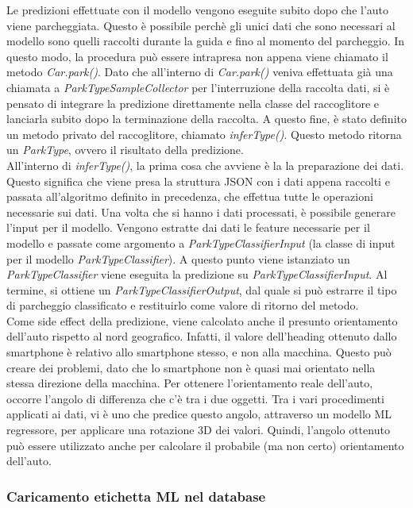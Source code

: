 Le predizioni effettuate con il modello vengono eseguite subito dopo che l'auto viene 
parcheggiata. Questo è possibile perchè gli unici dati che sono necessari al modello
sono quelli raccolti durante la guida e fino al momento del parcheggio. In questo modo,
la procedura può essere intrapresa non appena viene chiamato il metodo \emph{Car.park()}.
Dato che all'interno di \emph{Car.park()} veniva effettuata già una chiamata a 
\emph{ParkTypeSampleCollector} per l'interruzione della raccolta dati, si è pensato di 
integrare la predizione direttamente nella classe del raccoglitore e lanciarla subito
dopo la terminazione della raccolta. A questo fine, è stato definito un metodo privato
del raccoglitore, chiamato \emph{inferType()}. Questo metodo ritorna un \emph{ParkType},
ovvero il risultato della predizione.\\
All'interno di \emph{inferType()}, la prima cosa che avviene è la la preparazione dei 
dati. Questo significa che viene presa la struttura JSON con i dati appena raccolti e 
passata all'algoritmo definito in precedenza, che effettua tutte le operazioni necessarie
sui dati. Una volta che si hanno i dati processati, è possibile generare l'input per il 
modello. %
Vengono estratte dai dati le feature necessarie per il modello e passate come
argomento a \emph{ParkTypeClassifierInput} (la classe di input per il modello 
\emph{ParkTypeClassifier}). A questo punto viene istanziato un \emph{ParkTypeClassifier} 
viene eseguita la predizione su \emph{ParkTypeClassifierInput}. Al termine, si ottiene
un \emph{ParkTypeClassifierOutput}, dal quale si può estrarre il tipo di parcheggio 
classificato e restituirlo come valore di ritorno del metodo.\\
Come side effect della predizione, viene calcolato anche il presunto orientamento
dell'auto rispetto al nord geografico. Infatti, il valore dell'heading ottenuto 
dallo smartphone è relativo allo smartphone stesso, e non alla macchina. Questo 
può creare dei problemi, dato che lo smartphone non è quasi mai orientato nella 
stessa direzione della macchina. Per ottenere l'orientamento reale dell'auto,
occorre l'angolo di differenza che c'è tra i due oggetti. Tra i vari procedimenti 
applicati ai dati, vi è uno che predice questo angolo, attraverso un modello 
ML regressore, per applicare una rotazione 3D dei valori. Quindi, l'angolo ottenuto
può essere utilizzato anche per calcolare il probabile (ma non certo) orientamento
dell'auto.

\subsubsection{Caricamento etichetta ML nel database}

